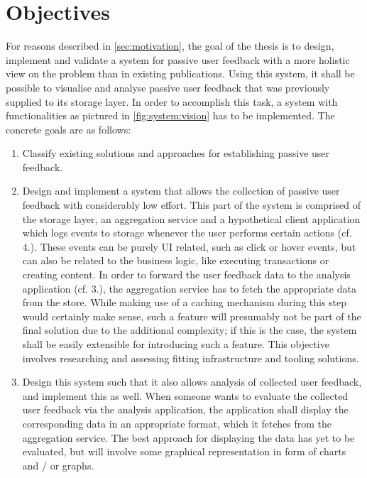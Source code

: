 %
\chapter{Objectives}
\label{sec:objectives}

For reasons described in \cref{sec:motivation}, the goal of the thesis is to design, implement and validate a system for passive user feedback with a more holistic view on the problem than in existing publications.
Using this system, it shall be possible to visualise and analyse passive user feedback that was previously supplied to its storage layer.
In order to accomplish this task, a system with functionalities as pictured in \cref{fig:system:vision} has to be implemented.
The concrete goals are as follows:

\begin{enumerate}
\item Classify existing solutions and approaches for establishing passive user feedback.
\item Design and implement a system that allows the collection of passive user feedback with considerably low effort.
This part of the system is comprised of the storage layer, an aggregation service and a hypothetical client application which logs events to storage whenever the user performs certain actions (cf. 4.).
These events can be purely UI related, such as click or hover events, but can also be related to the business logic, like executing transactions or creating content.
In order to forward the user feedback data to the analysis application (cf. 3.), the aggregation service has to fetch the appropriate data from the store.
While making use of a caching mechanism during this step would certainly make sense, such a feature will presumably not be part of the final solution due to the additional complexity; if this is the case, the system shall be easily extensible for introducing such a feature.
This objective involves researching and assessing fitting infrastructure and tooling solutions.
\item Design this system such that it also allows analysis of collected user feedback, and implement this as well.
When someone wants to evaluate the collected user feedback via the analysis application, the application shall display the corresponding data in an appropriate format, which it fetches from the aggregation service.
The best approach for displaying the data has yet to be evaluated, but will involve some graphical representation in form of charts and / or graphs.

\end{enumerate}
